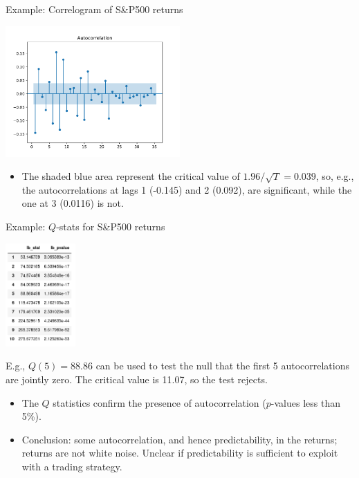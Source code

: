 \begin{frame}
\begin{block}{Example: Correlogram of S\&P500 returns}
\begin{center}
\includegraphics[width=0.5\textwidth]{sp500_acf}
\end{center}

\end{block}
\begin{itemize}
\item The shaded blue area represent the critical value of $1.96 / \sqrt{T}=0.039$, so, e.g., the autocorrelations at lags 1 (-0.145) and 2 (0.092), are significant, while the one at 3 (0.0116) is not.
\end{itemize}
\end{frame}

\begin{frame}
	\begin{block}{Example: $Q$-stats for S\&P500 returns}
		\begin{center}
			\includegraphics[width=0.2\textwidth]{q-stats}			
		\end{center}
		{\footnotesize E.g., $Q(5)=88.86$ can be used to test the null that the first 5 autocorrelations are jointly zero. The critical value is 11.07, so the test rejects.}
	\end{block}
	\begin{itemize}
		\item The $Q$ statistics confirm the presence of autocorrelation ($p$-values less than 5\%).
		\item Conclusion: some autocorrelation, and hence predictability, in the returns; returns are not white noise. Unclear if predictability is sufficient to exploit with a trading strategy.
	\end{itemize}
\end{frame}

